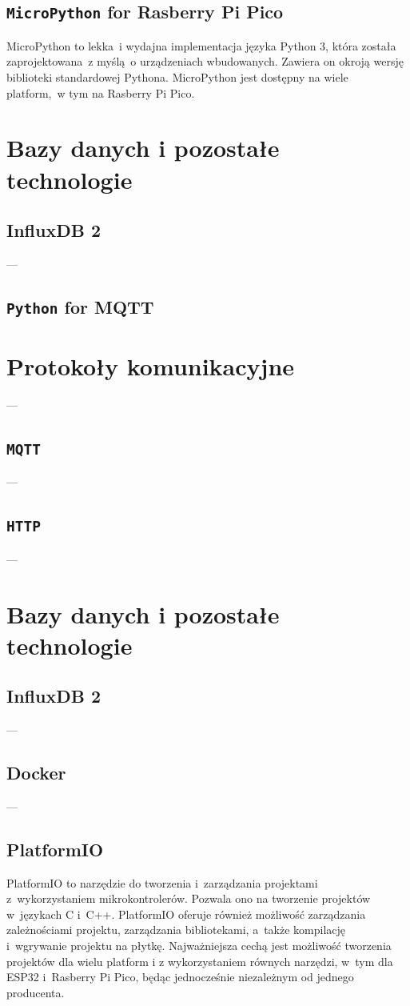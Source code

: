 \subsection{\texttt{MicroPython} for Rasberry Pi Pico}
MicroPython to lekka~i wydajna implementacja języka Python 3, która została zaprojektowana~z myślą~o urządzeniach wbudowanych. Zawiera on okroją wersję biblioteki standardowej Pythona. MicroPython jest dostępny na wiele platform,~w tym na Rasberry Pi Pico.~\cite{PICO:micropython}

\section{Bazy danych i pozostałe technologie}
\subsection{InfluxDB 2}
---
\subsection{\texttt{Python} for MQTT}

\section{Protokoły komunikacyjne}
---
\subsection{\texttt{MQTT}}
---
\subsection{\texttt{HTTP}}
---
\section{Bazy danych i pozostałe technologie}
\subsection{InfluxDB 2}
---
\subsection{Docker}
---
\subsection{PlatformIO}
PlatformIO to narzędzie do tworzenia i~zarządzania projektami z~wykorzystaniem mikrokontrolerów. Pozwala ono na tworzenie projektów w~językach C i~C++. PlatformIO oferuje również możliwość zarządzania zależnościami projektu, zarządzania bibliotekami, a~także kompilację i~wgrywanie projektu na płytkę. Najważniejsza cechą jest możliwość tworzenia projektów dla wielu platform i z wykorzystaniem równych narzędzi, w~tym dla ESP32 i~Rasberry Pi Pico, będąc jednocześnie niezależnym od jednego producenta.~\cite{tool:pio}

